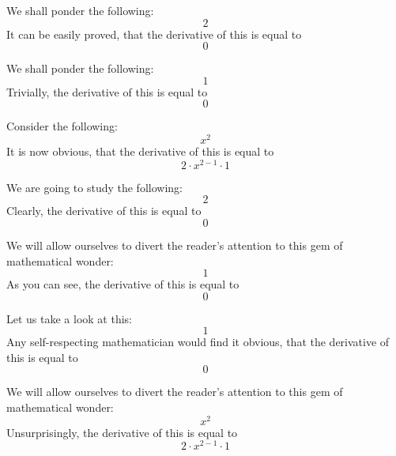 \documentclass{article}
\begin{document}
We shall ponder the following:
\begin{equation}
2 
\end{equation}
It can be easily proved, that the derivative of this is equal to
\begin{equation}
0 
\end{equation}

We shall ponder the following:
\begin{equation}
1 
\end{equation}
Trivially, the derivative of this is equal to
\begin{equation}
0 
\end{equation}

Consider the following:
\begin{equation}
x ^{2 } 
\end{equation}
It is now obvious, that the derivative of this is equal to
\begin{equation}
2 \cdot x ^{2 - 1 } \cdot 1 
\end{equation}

We are going to study the following:
\begin{equation}
2 
\end{equation}
Clearly, the derivative of this is equal to
\begin{equation}
0 
\end{equation}

We will allow ourselves to divert the reader's attention to this gem of mathematical wonder:
\begin{equation}
1 
\end{equation}
As you can see, the derivative of this is equal to
\begin{equation}
0 
\end{equation}

Let us take a look at this:
\begin{equation}
1 
\end{equation}
Any self-respecting mathematician would find it obvious, that the derivative of this is equal to
\begin{equation}
0 
\end{equation}

We will allow ourselves to divert the reader's attention to this gem of mathematical wonder:
\begin{equation}
x ^{2 } 
\end{equation}
Unsurprisingly, the derivative of this is equal to
\begin{equation}
2 \cdot x ^{2 - 1 } \cdot 1 
\end{equation}
\end{document}
